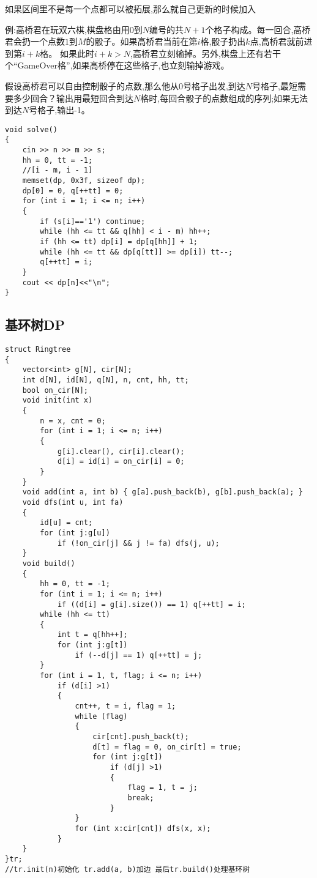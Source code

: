 \documentclass[a4paper, fontset=none]{ctexart}
\begin{document}
如果区间里不是每一个点都可以被拓展,那么就自己更新的时候加入

例:高桥君在玩双六棋,棋盘格由用$0$到$N$编号的共$N+1$个格子构成。每一回合,高桥君会扔一个点数$1$到$M$的骰子。如果高桥君当前在第$i$格,骰子扔出$k$点,高桥君就前进到第$i+k$格。 如果此时$i+k > N$,高桥君立刻输掉。另外,棋盘上还有若干个“GameOver格”,如果高桥停在这些格子,也立刻输掉游戏。

假设高桥君可以自由控制骰子的点数,那么他从$0$号格子出发,到达$N$号格子,最短需要多少回合？输出用最短回合到达$N$格时,每回合骰子的点数组成的序列;如果无法到达$N$号格子,输出-1。

\begin{verbatim}
void solve()
{
    cin >> n >> m >> s;
    hh = 0, tt = -1;
    //[i - m, i - 1]
    memset(dp, 0x3f, sizeof dp);
    dp[0] = 0, q[++tt] = 0;
    for (int i = 1; i <= n; i++)
    {
        if (s[i]=='1') continue;
        while (hh <= tt && q[hh] < i - m) hh++;
        if (hh <= tt) dp[i] = dp[q[hh]] + 1;
        while (hh <= tt && dp[q[tt]] >= dp[i]) tt--;
        q[++tt] = i;
    }
    cout << dp[n]<<"\n";
}
\end{verbatim}
\subsection{基环树DP}

\begin{verbatim}
struct Ringtree
{
    vector<int> g[N], cir[N];
    int d[N], id[N], q[N], n, cnt, hh, tt;
    bool on_cir[N];
    void init(int x)
    {
        n = x, cnt = 0;
        for (int i = 1; i <= n; i++)
        {
            g[i].clear(), cir[i].clear();
            d[i] = id[i] = on_cir[i] = 0;
        }
    }
    void add(int a, int b) { g[a].push_back(b), g[b].push_back(a); }
    void dfs(int u, int fa)
    {
        id[u] = cnt;
        for (int j:g[u])
            if (!on_cir[j] && j != fa) dfs(j, u);
    }
    void build()
    {
        hh = 0, tt = -1;
        for (int i = 1; i <= n; i++)
            if ((d[i] = g[i].size()) == 1) q[++tt] = i;
        while (hh <= tt)
        {
            int t = q[hh++];
            for (int j:g[t])
                if (--d[j] == 1) q[++tt] = j;
        }
        for (int i = 1, t, flag; i <= n; i++)
            if (d[i] >1)
            {
                cnt++, t = i, flag = 1;
                while (flag)
                {
                    cir[cnt].push_back(t);
                    d[t] = flag = 0, on_cir[t] = true;
                    for (int j:g[t])
                        if (d[j] >1)
                        {
                            flag = 1, t = j;
                            break;
                        }
                }
                for (int x:cir[cnt]) dfs(x, x);
            }
    }
}tr;
//tr.init(n)初始化 tr.add(a, b)加边 最后tr.build()处理基环树
\end{verbatim}
\end{document}
